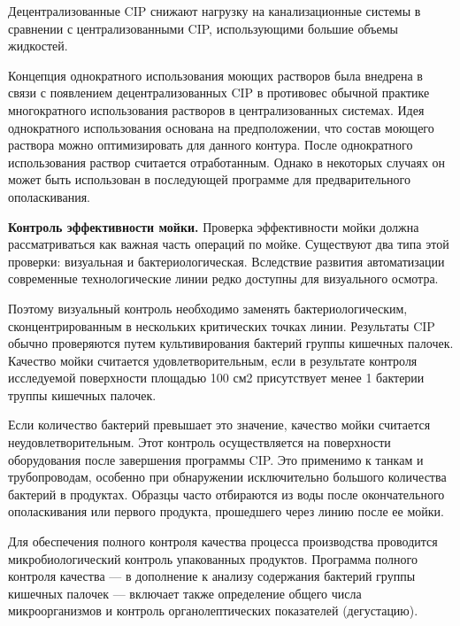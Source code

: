 {\par \redline Децентрализованные CIP снижают нагрузку на канализационные системы в сравнении с централизованными CIP, использующими большие объемы жидкостей.

\par \redline Концепция однократного использования моющих растворов была внедрена в связи с появлением децентрализованных CIP в противовес обычной практике многократного использования растворов в централизованных системах. Идея однократного использования основана на предположении, что состав моющего раствора можно оптимизировать для данного контура. После однократного использования раствор считается отработанным. Однако в некоторых случаях он может быть использован в последующей программе для предварительного ополаскивания.

\par \redline \textbf{Контроль эффективности мойки.} Проверка эффективности мойки должна рассматриваться как важная часть операций по мойке. Существуют два типа этой проверки: визуальная и бактериологическая. Вследствие развития автоматизации современные технологические линии редко доступны для визуального осмотра.

\par \redline Поэтому визуальный контроль необходимо заменять бактериологическим, сконцентрированным в нескольких критических точках линии. Результаты CIP обычно проверяются путем культивирования бактерий группы кишечных палочек. Качество мойки считается удовлетворительным, если в результате контроля исследуемой поверхности площадью 100 см2 присутствует менее 1 бактерии труппы кишечных палочек.

\par \redline Если количество бактерий превышает это значение, качество мойки считается неудовлетворительным. Этот контроль осуществляется на поверхности оборудования после завершения программы CIP. Это применимо к танкам и трубопроводам, особенно при обнаружении исключительно большого количества бактерий в продуктах. Образцы часто отбираются из воды после окончательного ополаскивания или первого продукта, прошедшего через линию после ее мойки.

\par \redline Для обеспечения полного контроля качества процесса производства проводится микробиологический контроль упакованных продуктов. Программа полного контроля качества — в дополнение к анализу содержания бактерий группы кишечных палочек — включает также определение общего числа микроорганизмов и контроль органолептических показателей (дегустацию).


\par
}

